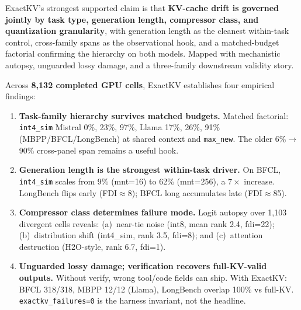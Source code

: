 \documentclass[11pt]{article}
\begin{document}
ExactKV's strongest supported claim is that \textbf{KV-cache drift is governed jointly
by task type, generation length, compressor class, and quantization granularity}, with
generation length as the cleanest within-task control, cross-family spans as the
observational hook, and a matched-budget factorial confirming the hierarchy on both
models. Mapped with mechanistic autopsy, unguarded lossy damage, and a three-family
downstream validity story.

Across \textbf{8,132 completed GPU cells}, ExactKV establishes four empirical findings:

\begin{enumerate}
\item \textbf{Task-family hierarchy survives matched budgets.} Matched factorial:
  \texttt{int4\_sim} Mistral 0\%, 23\%, 97\%, Llama 17\%, 26\%, 91\%
  (MBPP/BFCL/LongBench) at shared context and \texttt{max\_new}.
  The older 6\%$\to$90\% cross-panel span remains a useful hook.

\item \textbf{Generation length is the strongest within-task driver.} On BFCL,
  \texttt{int4\_sim} scales from 9\% (mnt=16) to 62\% (mnt=256), a $7\times$ increase.
  LongBench flips early (FDI$\approx$8); BFCL long accumulates late (FDI$\approx$85).

\item \textbf{Compressor class determines failure mode.} Logit autopsy over 1,103
  divergent cells reveals: (a)~near-tie noise (int8, mean rank 2.4, fdi=22);
  (b)~distribution shift (int4\_sim, rank 3.5, fdi=8); and (c)~attention destruction
  (H2O-style, rank 6.7, fdi=1).

\item \textbf{Unguarded lossy damage; verification recovers full-KV-valid outputs.}
  Without verify, wrong tool/code fields can ship. With ExactKV: BFCL 318/318, MBPP
  12/12 (Llama), LongBench overlap 100\% vs full-KV. \texttt{exactkv\_failures=0} is the
  harness invariant, not the headline.
\end{enumerate}
\end{document}
